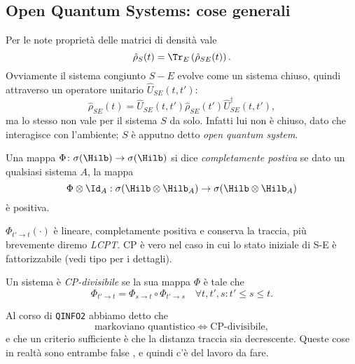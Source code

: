 \documentclass[a4]{article}
\begin{document}
\subsection{Open Quantum Systems: cose generali}
Per le note proprietà delle matrici di densità vale 
\[\hat{\rho}_S(t) = \Tr_E\left(\hat{\rho}_{SE}(t)\right).\]
Ovviamente il sistema congiunto \(S-E\) evolve come un sistema chiuso, quindi attraverso un
operatore unitario \(\hat{U}_{SE}(t, t')\):
\[\hat{\rho}_{SE}(t) = \hat{U}_{SE}(t, t') \hat{\rho}_{SE}(t') \hat{U}^{\dag}_{SE}(t, t'),\]
ma lo stesso non vale per il sistema \(S\) da solo. Infatti lui non è chiuso, dato che interagisce
con l'ambiente; \(S\) è apputno detto \emph{open quantum system}.

\begin{defn} Una mappa \(\Phi\colon \sigma(\Hilb) \to \sigma(\Hilb) \)
si dice \emph{completamente postiva} se dato un qualsiasi sistema \(A\), la mappa
\[\Phi \otimes \Id_A: \sigma(\Hilb \otimes \Hilb_A) \to \sigma(\Hilb \otimes \Hilb_A) \]
è positiva.
\end{defn}

\(\Phi_{t'\to t}(\cdot)\) è lineare, completamente positiva e conserva la traccia,
più brevemente  diremo \emph{LCPT}. CP è vero nel caso in cui lo stato iniziale di
S-E è fattorizzabile (vedi tipo \cite{breuer2007theory} per i dettagli).

\begin{defn} Un sistema è \emph{CP-divisibile} se la sua
mappa \(\Phi\) è tale che
\begin{equation} \label{eq:CPdiv}
\Phi_{t'\to t} = \Phi_{s\to t} \circ \Phi_{t'\to s} \quad \forall t, t', s: t' \le s \le t.
\end{equation}
\end{defn}
Al corso di \texttt{QINFO2} abbiamo detto che 
\[\text{markoviano quantistico} \iff \text{CP-divisibile}, \]
e che un criterio sufficiente è che la distanza traccia sia decrescente. Queste cose in realtà
sono entrambe false \cite{markovcondition}, e quindi c'è del lavoro da fare.
\end{document}
